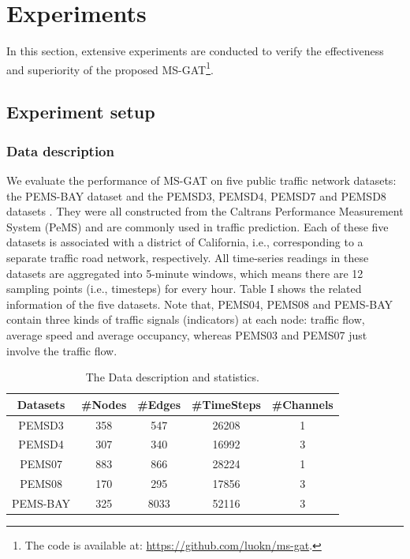 \section{Experiments}
\label{sec:experiments}
In this section, extensive experiments are conducted to verify the effectiveness and superiority of the proposed MS-GAT\footnote{The code is available at: \url{https://github.com/luokn/ms-gat}.}.

\subsection{Experiment setup}
\subsubsection{Data description}
We evaluate the performance of MS-GAT on five public traffic network datasets: the PEMS-BAY dataset  \cite{li2017diffusion} and the PEMSD3, PEMSD4, PEMSD7 and PEMSD8 datasets  \cite{song2020spatial}. They were all constructed from the Caltrans Performance Measurement System (PeMS) \cite{chen2001freeway} and are commonly used in traffic prediction. Each of these five datasets is associated with a district of California, i.e., corresponding to a separate traffic road network, respectively. All time-series readings in these datasets are aggregated into 5-minute windows, which means there are 12 sampling points (i.e., timesteps) for every hour. Table I shows the related information of the five datasets. Note that, PEMS04, PEMS08 and PEMS-BAY contain three kinds of traffic signals (indicators) at each node: traffic flow, average speed and average occupancy, whereas PEMS03 and PEMS07 just involve the traffic flow.

\begin{table}[!htb]
    \caption{The Data description and statistics.}
    \label{tab:datasets}
    \centering
    \begin{tabular}{ccccc}
        \toprule[2pt]
        Datasets & \#Nodes & \#Edges & \#TimeSteps & \#Channels \\
        \hline
        PEMSD3   & 358     & 547     & 26208       & 1          \\
        PEMSD4   & 307     & 340     & 16992       & 3          \\
        PEMS07   & 883     & 866     & 28224       & 1          \\
        PEMS08   & 170     & 295     & 17856       & 3          \\
        PEMS-BAY & 325     & 8033    & 52116       & 3          \\
        \bottomrule[2pt]
    \end{tabular}
\end{table}

